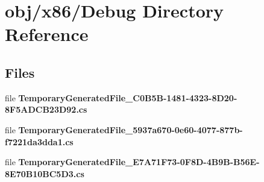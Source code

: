 \section{obj/x86/\+Debug Directory Reference}
\label{dir_0699898ec98f09a26b0de7d3d5aad840}
\subsection*{Files}
\begin{DoxyCompactItemize}
\item 
file {\bfseries Temporary\+Generated\+File\+\_\+C0\+B5\+B-\/1481-\/4323-\/8\+D20-\/8\+F5\+A\+D\+C\+B23\+D92.\+cs}
\item 
file {\bfseries Temporary\+Generated\+File\+\_\+5937a670-\/0e60-\/4077-\/877b-\/f7221da3dda1.\+cs}
\item 
file {\bfseries Temporary\+Generated\+File\+\_\+\+E7\+A71\+F73-\/0\+F8\+D-\/4\+B9\+B-\/\+B56\+E-\/8\+E70\+B10\+B\+C5\+D3.\+cs}
\end{DoxyCompactItemize}
